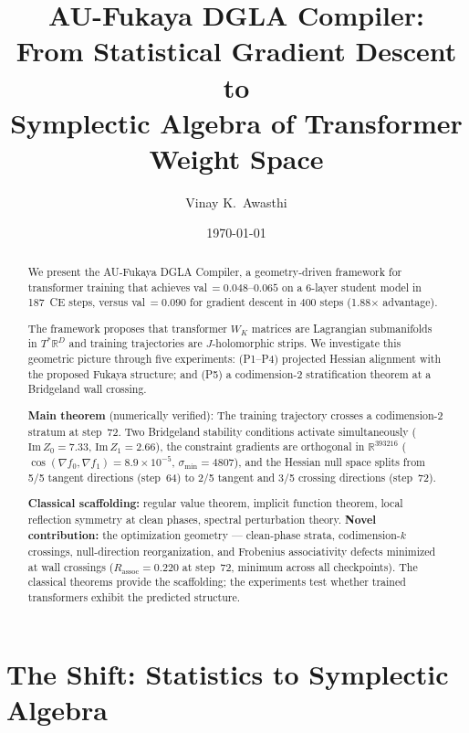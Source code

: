 \documentclass[11pt]{amsart}
\title{AU-Fukaya DGLA Compiler:\\
From Statistical Gradient Descent to\\
Symplectic Algebra of Transformer Weight Space}
\author{Vinay K.\ Awasthi}
\date{\today}
\begin{document}
\maketitle
\thispagestyle{plain}

\begin{abstract}
We present the AU-Fukaya DGLA Compiler, a geometry-driven framework for
transformer training that achieves val\,$= 0.048$--$0.065$ on a 6-layer
student model in 187~CE steps, versus val\,$= 0.090$ for gradient descent
in 400 steps (1.88$\times$ advantage).

The framework proposes that transformer $W_K$ matrices are Lagrangian
submanifolds in $T^*\mathbb{R}^D$ and training trajectories are
$J$-holomorphic strips.
We investigate this geometric picture through five experiments:
(P1--P4) projected Hessian alignment with the proposed Fukaya structure;
and (P5) a codimension-2 stratification theorem at a Bridgeland wall crossing.

\textbf{Main theorem} (numerically verified):
The training trajectory crosses a codimension-2 stratum at step~72.
Two Bridgeland stability conditions activate simultaneously
($\mathrm{Im}\,Z_0 = 7.33$, $\mathrm{Im}\,Z_1 = 2.66$),
the constraint gradients are orthogonal in $\mathbb{R}^{393216}$
($\cos(\nabla f_0, \nabla f_1) = 8.9\times10^{-5}$, $\sigma_\mathrm{min} = 4807$),
and the Hessian null space splits from 5/5 tangent directions (step~64)
to 2/5 tangent and 3/5 crossing directions (step~72).

\textbf{Classical scaffolding:} regular value theorem, implicit function theorem,
local reflection symmetry at clean phases, spectral perturbation theory.
\textbf{Novel contribution:} the optimization geometry ---
clean-phase strata, codimension-$k$ crossings, null-direction reorganization,
and Frobenius associativity defects minimized at wall crossings
($R_\mathrm{assoc} = 0.220$ at step~72, minimum across all checkpoints).
The classical theorems provide the scaffolding;
the experiments test whether trained transformers exhibit the predicted structure.
\end{abstract}

\tableofcontents

\section{The Shift: Statistics to Symplectic Algebra}
\label{sec:shift}
\end{document}
